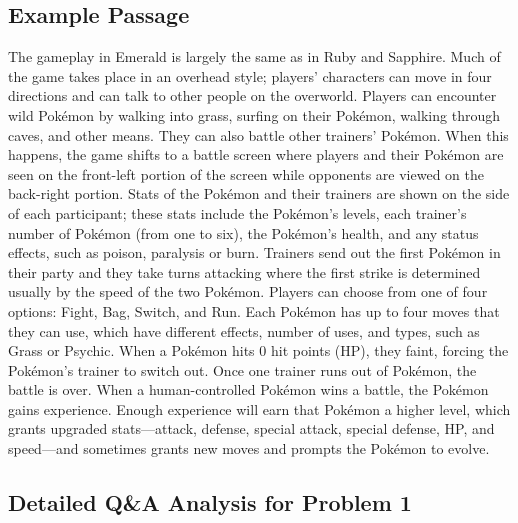 \documentclass[11pt]{article}
\begin{document}
\subsection{Example Passage}
\begin{mdframed}
The gameplay in Emerald is largely the same as in Ruby and Sapphire. Much of the game takes place in an overhead style; players' characters can move in four directions and can talk to other people on the overworld. Players can encounter wild Pokémon by walking into grass, surfing on their Pokémon, walking through caves, and other means. They can also battle other trainers' Pokémon. When this happens, the game shifts to a battle screen where players and their Pokémon are seen on the front-left portion of the screen while opponents are viewed on the back-right portion. Stats of the Pokémon and their trainers are shown on the side of each participant; these stats include the Pokémon's levels, each trainer's number of Pokémon (from one to six), the Pokémon's health, and any status effects, such as poison, paralysis or burn. Trainers send out the first Pokémon in their party and they take turns attacking where the first strike is determined usually by the speed of the two Pokémon. Players can choose from one of four options: Fight, Bag, Switch, and Run. Each Pokémon has up to four moves that they can use, which have different effects, number of uses, and types, such as Grass or Psychic. When a Pokémon hits 0 hit points (HP), they faint, forcing the Pokémon's trainer to switch out. Once one trainer runs out of Pokémon, the battle is over. When a human-controlled Pokémon wins a battle, the Pokémon gains experience. Enough experience will earn that Pokémon a higher level, which grants upgraded stats—attack, defense, special attack, special defense, HP, and speed—and sometimes grants new moves and prompts the Pokémon to evolve.
\end{mdframed}

\subsection{Detailed Q\&A Analysis for Problem 1}
\end{document}
